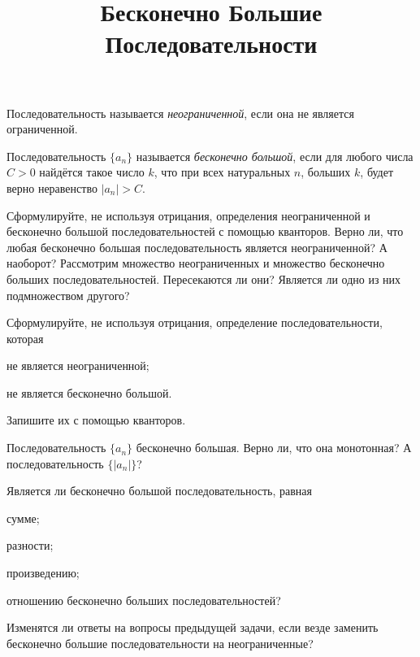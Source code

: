 \documentclass[a4paper, 12pt, num=25]{listok}
\begin{document}
\title{Бесконечно Большие Последовательности}
\maketitle{}
\begin{definition}
	Последовательность называется \textit{неограниченной}, если она не является ограниченной.
\end{definition}
\begin{definition}
	Последовательность $\{a_n\}$ называется \textit{бесконечно большой}, если для любого числа $C > 0$ найдётся такое число $k$,
	что при всех натуральных $n$, больших $k$, будет верно неравенство $|a_n| > C$.
\end{definition}
\begin{problem}
	Сформулируйте, не используя отрицания, определения неограниченной и бесконечно большой последовательностей с помощью кванторов.
	Верно ли, что любая бесконечно большая последовательность является неограниченной? А наоборот?
	Рассмотрим множество неограниченных и множество бесконечно больших последовательностей. Пересекаются ли они?
	Является ли одно из них подмножеством другого?
\end{problem}
\begin{problem}
	Сформулируйте, не используя отрицания, определение последовательности, которая
	\begin{probparts}
		\item не является неограниченной;
		\item не является бесконечно большой.
	\end{probparts}
	Запишите их с помощью кванторов.
\end{problem}
\begin{problem}
	Последовательность $\{a_n\}$ бесконечно большая. Верно ли, что она монотонная?
	А последовательность $\{|a_n|\}$?
\end{problem}
\begin{problem}
	Является ли бесконечно большой последовательность, равная
	\begin{probparts}
		\item сумме;
		\item разности;
		\item произведению;
		\item отношению бесконечно больших последовательностей?
	\end{probparts}
\end{problem}
\begin{problem}
	Изменятся ли ответы на вопросы предыдущей задачи, если везде заменить бесконечно большие последовательности на неограниченные?
\end{problem}
\end{document}
